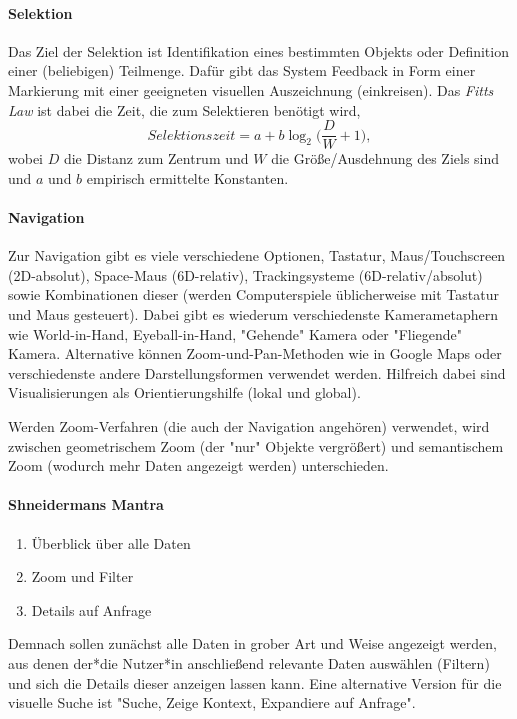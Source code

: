 				\paragraph{Selektion}
					Das Ziel der Selektion ist Identifikation eines bestimmten Objekts oder Definition einer (beliebigen) Teilmenge. Dafür gibt das System Feedback in Form einer Markierung mit einer geeigneten visuellen Auszeichnung (\zB einkreisen). Das \emph{Fitts Law} ist dabei die Zeit, die zum Selektieren benötigt wird,
					\begin{equation}
						\mathit{Selektionszeit} = a + b \log_2\biggl(\frac{D}{W} + 1\biggr),
					\end{equation}
					wobei \(D\) die Distanz zum Zentrum und \(W\) die Größe/Ausdehnung des Ziels sind und \(a\) und \(b\) empirisch ermittelte Konstanten.

				\paragraph{Navigation}
					Zur Navigation gibt es viele verschiedene Optionen, \bspw Tastatur, Maus/Touchscreen (2D-absolut), Space-Maus (6D-relativ), Trackingsysteme (6D-relativ/absolut) sowie Kombinationen dieser (\zB werden Computerspiele üblicherweise mit Tastatur und Maus gesteuert). Dabei gibt es wiederum verschiedenste Kamerametaphern wie World-in-Hand, Eyeball-in-Hand, "Gehende" Kamera oder "Fliegende" Kamera. Alternative können Zoom-und-Pan-Methoden wie in Google Maps oder verschiedenste andere Darstellungsformen verwendet werden. Hilfreich dabei sind Visualisierungen als Orientierungshilfe (lokal und global).

					Werden Zoom-Verfahren (die auch der Navigation angehören) verwendet, wird zwischen geometrischem Zoom (der "nur" Objekte vergrößert) und semantischem Zoom (wodurch mehr Daten angezeigt werden) unterschieden.

				\paragraph{Shneidermans Mantra}
					\begin{enumerate}
						\item Überblick über alle Daten
						\item Zoom und Filter
						\item Details auf Anfrage
					\end{enumerate}
					Demnach sollen zunächst alle Daten in grober Art und Weise angezeigt werden, aus denen der*die Nutzer*in anschließend relevante Daten auswählen (Filtern) und sich die Details dieser anzeigen lassen kann. Eine alternative Version für die visuelle Suche ist "Suche, Zeige Kontext, Expandiere auf Anfrage".

